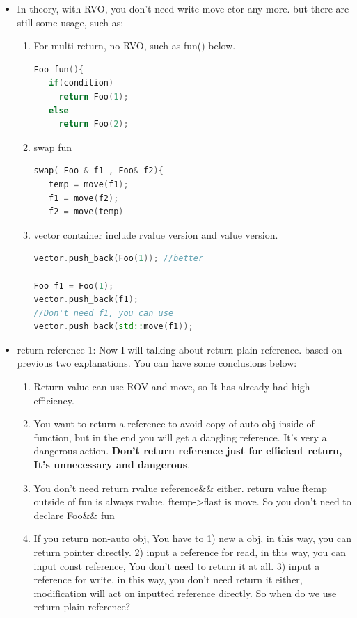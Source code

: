 \documentclass[a4paper,12pt,twoside]{book}
\begin{document}
\begin{itemize}
\item In theory, with RVO, you don't need write move ctor any more. but there are still some usage, such as:
\begin{enumerate}
\item For multi return, no RVO, such as fun() below.
\begin{lstlisting}[frame=single, language=c++]
Foo fun(){
   if(condition)
     return Foo(1);
   else
     return Foo(2);
\end{lstlisting}
\item swap fun
\begin{lstlisting}[frame=single, language=c++]
swap( Foo & f1 , Foo& f2){
   temp = move(f1);
   f1 = move(f2);
   f2 = move(temp)
\end{lstlisting}
\item vector container include rvalue version and value version.
\begin{lstlisting}[frame=single, language=c++]
vector.push_back(Foo(1)); //better

Foo f1 = Foo(1);
vector.push_back(f1);
//Don't need f1, you can use
vector.push_back(std::move(f1));
\end{lstlisting}
\end{enumerate}


\item return reference 1: Now I will talking about return plain reference. based on previous two explanations. You can have some conclusions below:

\begin{enumerate}
\item Return value can use ROV and move, so It has already had high efficiency.
\item You want to return a reference to avoid copy of auto obj inside of function,  but in the end you will get a dangling reference. It's very a dangerous action. \textbf{Don't return reference just for efficient return, It's unnecessary and dangerous}.
\item You don't need return rvalue reference\&\& either.  return value ftemp outside of fun is always rvalue. ftemp->flast is move.  So you don't need to declare Foo\&\& fun
\item If you return non-auto obj, You have to 1) new a obj, in this way, you can return pointer directly. 2) input a reference for read, in this way, you can input const reference, You don't need to return it at all. 3) input a reference for write, in this way, you don't need return it either, modification will act on inputted reference directly. So when do we use return plain reference?
\end{enumerate}


\end{itemize}
\end{document}
